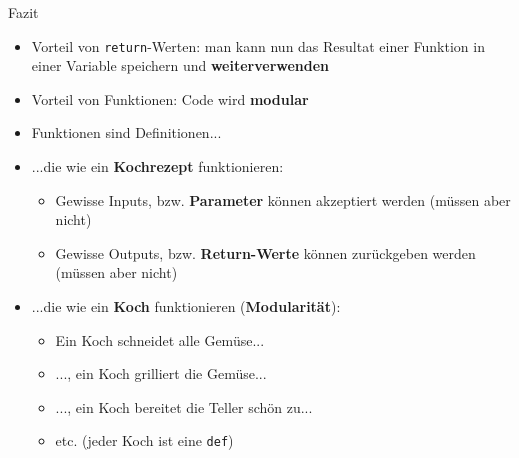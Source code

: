 \begin{frame}{Fazit}
\begin{itemize}[<+->]
	\item {} Vorteil von \lstinline|return|-Werten: man kann nun das Resultat einer Funktion in einer Variable speichern und \textbf{weiterverwenden}
	\item {} Vorteil von Funktionen: Code wird \textbf{modular}
	\item Funktionen sind Definitionen...
	\item {} ...die wie ein \textbf{Kochrezept} funktionieren:
	\begin{itemize}
		\item {}   Gewisse Inputs, bzw. \textbf{Parameter} können akzeptiert werden (müssen aber nicht)
		\item {} Gewisse Outputs, bzw. \textbf{Return-Werte }können zurückgeben werden (müssen aber nicht)
	\end{itemize}
	\item {} ...die wie ein \textbf{Koch} funktionieren (\textbf{Modularität}):
	\begin{itemize}
		\item Ein Koch schneidet alle Gemüse...
		\item ..., ein Koch grilliert die Gemüse...
		\item ..., ein Koch bereitet die Teller schön zu...
		\item etc. (jeder Koch ist eine \lstinline|def|)
	\end{itemize}
\end{itemize}
\end{frame}





